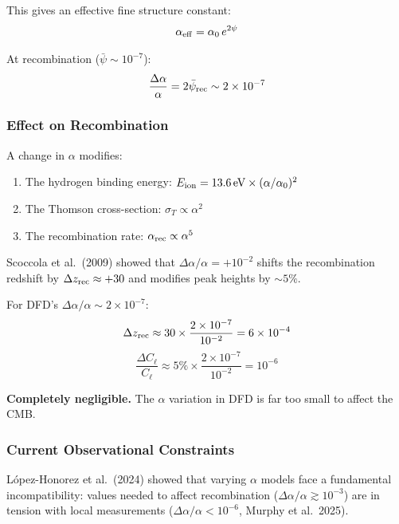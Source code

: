 \documentclass[11pt,a4paper]{article}
\begin{document}
This gives an effective fine structure constant:
\begin{equation}
\alpha_{\rm eff} = \alpha_0\,e^{2\psi}
\end{equation}

At recombination ($\bar{\psi} \sim 10^{-7}$):
\begin{equation}
\frac{\Delta\alpha}{\alpha} = 2\bar{\psi}_{\rm rec} \sim 2\times10^{-7}
\end{equation}

\subsubsection{Effect on Recombination}

A change in $\alpha$ modifies:
\begin{enumerate}
\item The hydrogen binding energy: $E_{\rm ion} = 13.6\,\text{eV}\times(\alpha/\alpha_0)^2$
\item The Thomson cross-section: $\sigma_T \propto \alpha^2$
\item The recombination rate: $\alpha_{\rm rec} \propto \alpha^5$
\end{enumerate}

Scoccola et al.\ (2009) showed that $\Delta\alpha/\alpha = +10^{-2}$ shifts the recombination redshift by $\Delta z_{\rm rec} \approx +30$ and modifies peak heights by $\sim 5\%$.

For DFD's $\Delta\alpha/\alpha \sim 2\times10^{-7}$:
\begin{equation}
\Delta z_{\rm rec} \approx 30 \times \frac{2\times10^{-7}}{10^{-2}} = 6\times10^{-4}
\end{equation}
\begin{equation}
\frac{\Delta C_\ell}{C_\ell} \approx 5\% \times \frac{2\times10^{-7}}{10^{-2}} = 10^{-6}
\end{equation}

\textbf{Completely negligible.} The $\alpha$ variation in DFD is far too small to affect the CMB.

\subsubsection{Current Observational Constraints}

L\'{o}pez-Honorez et al.\ (2024) showed that varying $\alpha$ models face a fundamental incompatibility: values needed to affect recombination ($\Delta\alpha/\alpha \gtrsim 10^{-3}$) are in tension with local measurements ($\Delta\alpha/\alpha < 10^{-6}$, Murphy et al.\ 2025).
\end{document}
